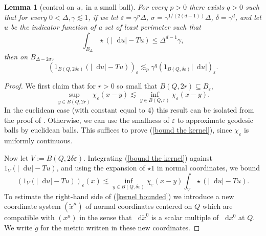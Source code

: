 \documentclass[reqno,12pt,letterpaper]{amsart}
\newcommand*\dif{\mathop{}\!\mathrm{d}}
\newtheorem{lemma}[theorem]{Lemma}
\theoremstyle{definition}
\numberwithin{equation}{section}
\begin{document}
\begin{lemma}[control on $u_\varepsilon$ in a small ball]\label{mollifier sublemma}
For every $p > 0$ there exists $q > 0$ such that for every $0 < \Delta, \gamma \lesssim 1$, if we let $\varepsilon = \gamma^p \Delta$, $\sigma = \gamma^{1/(2(d - 1))} \Delta$, $\delta = \gamma^d$, and let $u$ be the indicator function of a set of least perimeter such that
\begin{equation}\label{hypothesis on mollifier sublemma}
\int_{B_\Delta} \star(|\dif u| - Tu) \leq \Delta^{d - 1} \gamma,
\end{equation}
then on $B_{\Delta - 2\sigma}$,
$$(1_{B(Q, 2\delta\varepsilon)}(|\dif u| - Tu))_\varepsilon \lesssim_p \gamma^q (1_{B(Q, \delta\varepsilon)} |\dif u|)_\varepsilon.$$
\end{lemma}
\begin{proof}
We first claim that for $r > 0$ so small that $B(Q, 2r) \subseteq B_\varepsilon$,
\begin{equation}\label{bound the kernel}
\sup_{y \in B(Q, 2r)} \chi_\varepsilon(x - y) \lesssim \inf_{y \in B(Q, r)} \chi_\varepsilon(x - y).
\end{equation}
In the euclidean case (with constant equal to $4$) this result can be isolated from the proof of \cite[Theorem 7.3]{Giusti77}.
Otherwise, we can use the smallness of $\varepsilon$ to approximate geodesic balls by euclidean balls.
This suffices to prove (\ref{bound the kernel}), since $\chi_\varepsilon$ is uniformly continuous.

Now let $V := B(Q, 2\delta\varepsilon)$.
Integrating (\ref{bound the kernel}) against $1_V(|\dif u| - Tu)$, and using the expansion of $\star 1$ in normal coordinates, we bound
\begin{equation}\label{kernel bounded}
(1_V(|\dif u| - Tu))_\varepsilon(x) \lesssim \inf_{y \in B(Q, \delta\varepsilon)} \chi_\varepsilon(x - y) \int_V \star (|\dif u| - Tu).
\end{equation}
To estimate the right-hand side of (\ref{kernel bounded}) we introduce a new coordinate system $(\tilde x^\mu)$ of normal coordinates centered on $Q$ which are compatible with $(x^\mu)$ in the sense that $\dif \tilde x^0$ is a scalar multiple of $\dif x^0$ at $Q$.
We write $\tilde g$ for the metric written in these new coordinates.


\end{proof}
\end{document}

